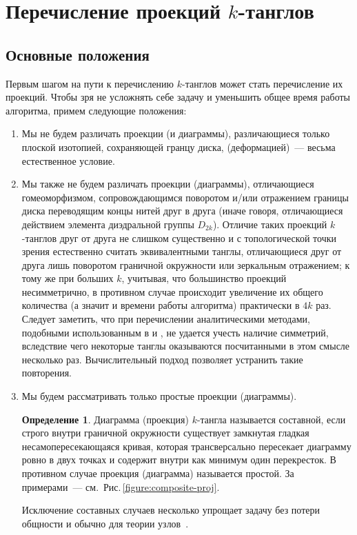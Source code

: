 \documentclass[12pt]{article}
\theoremstyle{plain}
\theoremstyle{definition}
\newtheorem{definition}{Определение}
\def\figureref#1{Рис.\,\protect\ref{#1}}
\begin{document}
	\newpage
	\section{Перечисление проекций $k$-танглов}
	\label{section:projections}

	\subsection{Основные положения}
	\label{subsection:projection-statements}

		Первым шагом на пути к перечислению $k$-танглов может стать перечисление их проекций. Чтобы зря не усложнять себе задачу и
		уменьшить общее время работы алгоритма, примем следующие положения:
		\begin{enumerate}
			\item
			Мы не будем различать проекции (и диаграммы), различающиеся только плоской изотопией, сохраняющей гранцу диска,
			(деформацией)~--- весьма естественное условие.

			\item
			Мы также не будем различать проекции (диаграммы), отличающиеся гомеоморфизмом, сопровождающимся поворотом и/или отражением
			границы диска переводящим концы нитей друг в друга (иначе говоря, отличающиеся действием элемента диэдральной группы
			$D_{2k}$). Отличие таких проекций $k$-танглов друг от друга не слишком существенно и с топологической точки зрения
			естественно считать эквивалентными танглы, отличающиеся друг от друга лишь поворотом граничной окружности или зеркальным отражением;
			к тому же при больших $k$, учитывая, что большинство проекций несимметрично, в противном случае происходит увеличение их
			общего количества (а значит и времени работы алгоритма) практически в $4k$ раз. Следует заметить, что при перечислении
			аналитическими методами, подобными использованным в \cite{JustinZuber2003} и \cite{SundbergThistlethwaite1998}, не удается
			учесть наличие симметрий, вследствие чего некоторые танглы оказываются посчитанными в этом смысле несколько раз. Вычислительный
			подход позволяет устранить такие повторения.

			\item
			Мы будем рассматривать только простые проекции (диаграммы).
			\begin{definition}
				Диаграмма (проекция) $k$-тангла называется составной, если строго внутри граничной окружности существует замкнутая
				гладкая несамопересекающаяся кривая, которая трансверсально пересекает диаграмму ровно в двух точках и содержит
				внутри как минимум один перекресток. В противном случае проекция (диаграмма) называется простой. За примерами~---
				см.~\figureref{figure:composite-proj}.
			\end{definition}
			Исключение составных случаев несколько упрощает задачу без потери общности и обычно для теории узлов~\cite{Cromwell2004}.


\end{enumerate}
\end{document}
